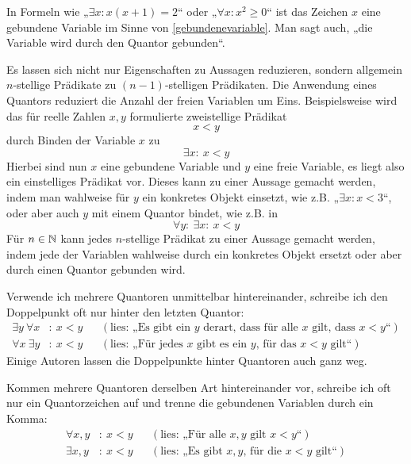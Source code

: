 \begin{bem} \label{quantorbindung}
    In Formeln wie „$\exists x: x(x+1)=2$“ oder „$\forall x: x^2\ge 0$“ ist das Zeichen $x$ eine gebundene Variable im Sinne von \cref{gebundenevariable}. Man sagt auch, „die Variable wird durch den Quantor gebunden“.

    Es lassen sich nicht nur Eigenschaften zu Aussagen reduzieren, sondern allgemein $n$-stellige Prädikate zu $(n-1)$-stelligen Prädikaten. Die Anwendung eines Quantors reduziert die Anzahl der freien Variablen um Eins. Beispielsweise wird das für reelle Zahlen $x,y$ formulierte zweistellige Prädikat
        \[ x < y \]
    durch Binden der Variable $x$ zu
        \[ \exists x:\ x<y \]
    Hierbei sind nun $x$ eine gebundene Variable und $y$ eine freie Variable, es liegt also ein einstelliges Prädikat vor. Dieses kann zu einer Aussage gemacht werden, indem man wahlweise für $y$ ein konkretes Objekt einsetzt, wie z.B. „$\exists x: x < 3$“, oder aber auch $y$ mit einem Quantor bindet, wie z.B. in
        \[ \forall y:\ \exists x:\ x < y \]
    Für $n\in \mathbb N$ kann jedes $n$-stellige Prädikat zu einer Aussage gemacht werden, indem jede der Variablen wahlweise durch ein konkretes Objekt ersetzt oder aber durch einen Quantor gebunden wird.
\end{bem}
 
 
\begin{nota}
    Verwende ich mehrere Quantoren unmittelbar hintereinander, schreibe ich den Doppelpunkt oft nur hinter den letzten Quantor:
    \begin{align*}
        \exists y\ \forall x& :\ x < y && (\text{lies: „Es gibt ein $y$ derart, dass für alle $x$ gilt, dass $x<y$“}) \\
        \forall x\ \exists y& :\ x < y && (\text{lies: „Für jedes $x$ gibt es ein $y$, für das $x<y$ gilt“})  
    \end{align*}
    Einige Autoren lassen die Doppelpunkte hinter Quantoren auch ganz weg.
    
    Kommen mehrere Quantoren derselben Art hintereinander vor, schreibe ich oft nur ein Quantorzeichen auf und trenne die gebundenen Variablen durch ein Komma:
    \begin{align*}
        \forall x,y&:\ x<y && (\text{lies: „Für alle $x,y$ gilt $x<y$“}) \\
        \exists x,y&:\ x<y && (\text{lies: „Es gibt $x,y$, für die $x<y$ gilt“}) 
    \end{align*}
\end{nota}

